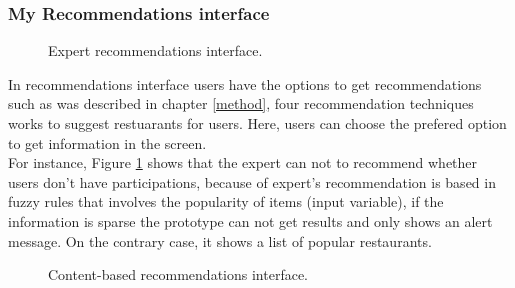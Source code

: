 \subsubsection{My Recommendations interface}

\begin{figure}
\captionsetup{font=footnotesize}
\centering
{}
\caption{Expert recommendations interface.}
\label{fig:expert-recs}   
\end{figure}
In recommendations interface users have the options to get  
recommendations such as was described in chapter \ref{method}, four 
recommendation techniques works to suggest restuarants for 
users. Here, users can choose the prefered option to get 
information in the screen.\\ 
For instance, Figure \ref{fig:expert-recs} shows that the expert can 
not to recommend whether users don’t have participations, because of expert's
recommendation is based in fuzzy rules that involves the popularity of
items (input variable), if the information is sparse the prototype can
not get results and only shows an alert message. On the contrary case,
it shows a list of popular restaurants.
\begin{figure}
\captionsetup{font=footnotesize}
\centering
{}
\caption{Content-based recommendations interface.}
\label{fig:base-content}   
\end{figure}
